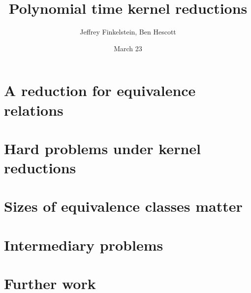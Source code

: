 \documentclass{lposter-with-tkz-graph} %
\title{Polynomial time kernel reductions}
\author{Jef{}frey Finkelstein, Ben Hescott}
\date{March 23}
\theoremstyle{definition} \newtheorem*{definition}{Definition}
\begin{document}
\begin{poster}


\section{A reduction for equivalence relations}


\columnbreak




\section{Hard problems under kernel reductions}


\section{Sizes of equivalence classes matter}


\columnbreak


\section{Intermediary problems}


\section{Further work}


\nocite{bcffm}
\nocite{fg09}



%

\end{poster}
\end{document}
